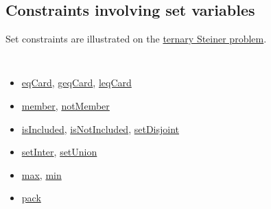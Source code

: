 \subsection{Constraints involving set variables}\label{model:setconstraints}\hypertarget{model:setconstraints}{}
Set constraints are illustrated on the \hyperlink{model:example2:ternarysteinerchoco}{ternary Steiner problem}. 
\begin{notedef}\tt
  \begin{itemize}
  \item \hyperlink{eqcard:eqcardconstraint}{eqCard}, \hyperlink{geqcard:geqcardconstraint}{geqCard}, \hyperlink{leqcard:leqcardconstraint}{leqCard}
  \item \hyperlink{member:memberconstraint}{member}, \hyperlink{notmember:notmemberconstraint}{notMember}
  \item \hyperlink{isincluded:isincludedconstraint}{isIncluded}, \hyperlink{isnotincluded:isnotincludedconstraint}{isNotIncluded}, \hyperlink{setdisjoint:setdisjointconstraint}{setDisjoint}
  \item \hyperlink{setinter:setinterconstraint}{setInter}, \hyperlink{setunion:setunionconstraint}{setUnion}
  \item \hyperlink{max:maxofaset}{max}, \hyperlink{min:minofaset}{min}
  \item \hyperlink{pack:packconstraint}{pack}
  \end{itemize}
\end{notedef}


